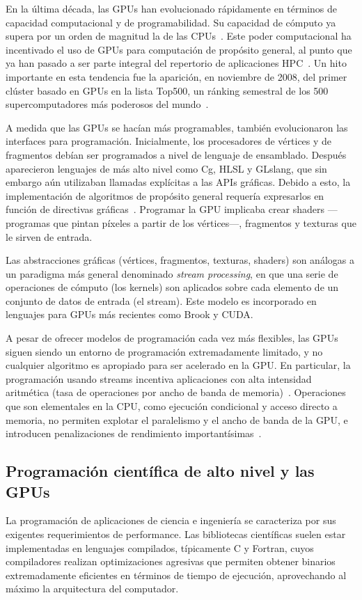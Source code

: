 \documentclass[11pt,spanish]{article}
\begin{document}
En la última década, las GPUs han evolucionado rápidamente en términos de
capacidad computacional y de programabilidad.  Su capacidad de cómputo ya supera
por un orden de magnitud la de las CPUs~\cite{gpupp}.  Este poder computacional ha
incentivado el uso de GPUs para computación de propósito general, al punto que
ya han pasado a ser parte integral del repertorio de aplicaciones
HPC~\cite{gpu-computing}.
Un hito importante en esta tendencia fue la aparición, en noviembre de 2008, del
primer clúster basado en GPUs en la lista Top500, un ránking semestral de los
500 supercomputadores más poderosos del mundo~\cite{top500}.

A medida que las GPUs se hacían más programables, también evolucionaron las
interfaces para programación.  Inicialmente, los procesadores de
vértices y de fragmentos debían ser programados a nivel de lenguaje de
ensamblado.
Después aparecieron lenguajes de más alto nivel como Cg, HLSL y GLslang,
que sin embargo aún utilizaban llamadas explícitas a las APIs gráficas.
Debido a esto, la implementación de algoritmos de propósito general
requería expresarlos en función de directivas gráficas~\cite[\S2.2]{brookgpu}.
Programar la GPU implicaba crear shaders ---programas que pintan píxeles a partir
de los vértices---, fragmentos y texturas que le sirven de entrada.

Las abstracciones gráficas (vértices, fragmentos, texturas, shaders)
son análogas a un paradigma más general denominado \emph{stream processing},
en que una serie de operaciones de cómputo (los kernels) son aplicados sobre
cada elemento de un conjunto de datos de entrada (el stream).  Este modelo es
incorporado en lenguajes para GPUs más recientes como Brook y CUDA.

A pesar de ofrecer modelos de programación cada vez más flexibles,
las GPUs siguen siendo un entorno de programación extremadamente limitado,
y no cualquier algoritmo es apropiado para ser acelerado en la GPU.
En particular, la programación usando streams
incentiva aplicaciones con alta intensidad aritmética
(tasa de operaciones por ancho de banda de memoria)~\cite[\S2.1]{brookgpu}.
Operaciones que son elementales en la CPU, como
ejecución condicional y acceso directo a memoria, no permiten explotar el
paralelismo y el ancho de banda de la GPU, e introducen penalizaciones de
rendimiento importantísimas~\cite[\S{}V.C]{gpu-computing}.

\subsection{Programación científica de alto nivel y las GPUs}
La programación de aplicaciones de ciencia e ingeniería se caracteriza por sus
exigentes requerimientos de performance.  Las bibliotecas científicas suelen
estar implementadas en lenguajes compilados, típicamente C y Fortran, cuyos
compiladores realizan optimizaciones agresivas que permiten obtener binarios
extremadamente eficientes en términos de tiempo de ejecución, aprovechando al
máximo la arquitectura del computador.
\end{document}
